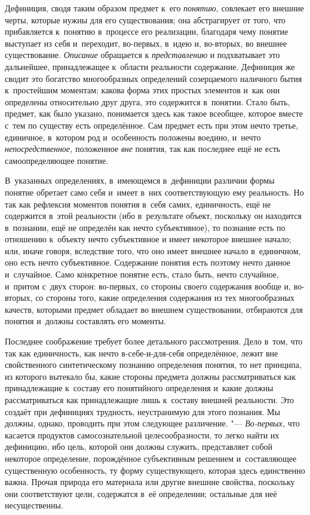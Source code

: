 Дефиниция, сводя таким образом предмет к~его
{\em понятию,} совлекает
его внешние черты, которые нужны для его существования; она абстрагирует от
того, что прибавляется к~понятию в~процессе его реализации, благодаря чему
понятие выступает из себя и~переходит, во-первых, в~идею и, во-вторых, во
внешнее существование. {\em Описание}
обращается к
{\em представлению} и
подхватывает это дальнейшее, принадлежащее к~области реальности содержание.
Дефиниция же сводит это богатство многообразных определений созерцаемого
наличного бытия к~простейшим моментам; какова форма этих простых элементов
и~как они определены относительно друг друга, это содержится в~понятии.
Стало быть, предмет, как было указано, понимается здесь как такое всеобщее,
которое вместе с~тем по существу есть определённое. Сам предмет есть при
этом нечто третье, единичное, в~котором род и~особенность
положены воедино, и~нечто
{\em непосредственное,}
положенное {\em вне}
понятия, так как последнее ещё не есть самоопределяющее
понятие.

В~указанных определениях, в~имеющемся в~дефиниции различии
формы понятие обретает само себя и~имеет в~них соответствующую ему
реальность. Но так как рефлексия моментов понятия в~себя самих,
единичность, ещё не содержится в~этой реальности (ибо в~результате объект,
поскольку он находится в~познании, ещё не определён как нечто
субъективное), то познание есть по отношению к~объекту нечто субъективное и
имеет некоторое внешнее начало; или, иначе говоря, вследствие того, что оно
имеет внешнее начало в~единичном, оно есть нечто субъективное. Содержание
понятия есть поэтому нечто данное и~случайное. Само конкретное понятие
есть, стало быть, нечто случайное, и~притом с~двух сторон: во-первых, со
стороны своего содержания вообще и, во-вторых, со стороны того, какие
определения содержания из тех многообразных качеств, которыми предмет
обладает во внешнем существовании, отбираются для понятия и~должны
составлять его моменты.

Последнее соображение требует более детального рассмотрения.
Дело в~том, что так как единичность, как нечто
в-себе-и-для-себя определённое, лежит вне свойственного
синтетическому познанию определения понятия, то нет принципа, из которого
вытекало бы, какие стороны предмета должны рассматриваться как
принадлежащие к~составу его понятийного определения и~какие должны
рассматриваться как принадлежащие лишь к~составу внешней реальности. Это
создаёт при дефинициях трудность, неустранимую для этого познания. Мы
должны, однако, проводить при этом следующее различение. "---
{\em Во-первых,} что
касается продуктов самосознательной целесообразности, то легко найти их
дефиницию, ибо цель, которой они должны служить, представляет собой
некоторое определение, порождённое субъективным решением и~составляющее
существенную особенность, ту форму существующего, которая здесь единственно
важна. Прочая природа его материала или другие внешние свойства, поскольку
они соответствуют цели, содержатся в~её определении; остальные для неё
несущественны.

